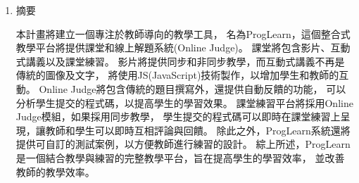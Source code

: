 \documentclass[12pt]{article}
\begin{document}
\date{}
\usetikzlibrary{automata, positioning, arrows}
{}

\begin{enumerate}
  \setlength{\parindent}{2em}
  \item 摘要 
    \par 本計畫將建立一個專注於教師導向的教學工具，
    名為ProgLearn，這個整合式教學平台將提供課堂和線上解題系統(Online Judge)。
    課堂將包含影片、互動式講義以及課堂練習。
    影片將提供同步和非同步教學，而互動式講義不再是傳統的圖像及文字，
    將使用JS(JavaScript)技術製作，以增加學生和教師的互動。
    Online Judge將包含傳統的題目撰寫外，還提供自動反饋的功能，
    可以分析學生提交的程式碼，以提高學生的學習效果。
    課堂練習平台將採用Online Judge模組，如果採用同步教學，
    學生提交的程式碼可以即時在課堂練習上呈現，讓教師和學生可以即時互相評論與回饋。
    除此之外，ProgLearn系統還將提供可自訂的測試案例，以方便教師進行練習的設計。
    綜上所述，ProgLearn是一個結合教學與練習的完整教學平台，旨在提高學生的學習效率，
    並改善教師的教學效率。


\end{enumerate}
\end{document}

